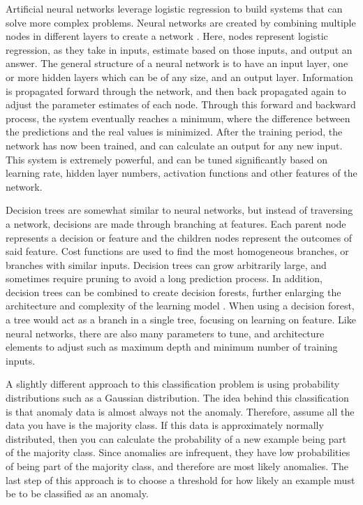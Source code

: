 \documentclass[midd]{thesis}
\begin{document}
Artificial neural networks leverage logistic regression to build systems that can solve more complex problems. Neural networks are created by combining multiple nodes in different layers to create a network \cite{Suryansh}. Here, nodes represent logistic regression, as they take in inputs, estimate based on those inputs, and output an answer. The general structure of a neural network is to have an input layer, one or more hidden layers which can be of any size, and an output layer. Information is propagated forward through the network, and then back propagated again to adjust the parameter estimates of each node. Through this forward and backward process, the system eventually reaches a minimum, where the difference between the predictions and the real values is minimized. After the training period, the network has now been trained, and can calculate an output for any new input. This system is extremely powerful, and can be tuned significantly based on learning rate, hidden layer numbers, activation functions and other features of the network. 

Decision trees are somewhat similar to neural networks, but instead of traversing a network, decisions are made through branching at features. Each parent node represents a decision or feature and the children nodes represent the outcomes of said feature. Cost functions are used to find the most homogeneous branches, or branches with similar inputs. Decision trees can grow arbitrarily large, and sometimes require pruning to avoid a long prediction process. In addition, decision trees can be combined to create decision forests, further enlarging the architecture and complexity of the learning model \cite{Gupta}. When using a decision forest, a tree would act as a branch in a single tree, focusing on learning on feature. Like neural networks, there are also many parameters to tune, and architecture elements to adjust such as maximum depth and minimum number of training inputs.

A slightly different approach to this classification problem is using probability distributions such as a Gaussian distribution. The idea behind this classification is that anomaly data is almost always not the anomaly. Therefore, assume all the data you have is the majority class. If this data is approximately normally distributed, then you can calculate the probability of a new example being part of the majority class. Since anomalies are infrequent, they have low probabilities of being part of the majority class, and therefore are most likely anomalies. The last step of this approach is to choose a threshold for how likely an example must be to be classified as an anomaly. 
\end{document}

